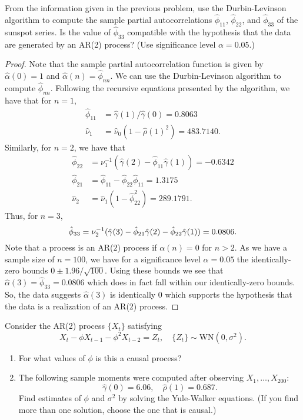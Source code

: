 \documentclass[12pt]{article}
\theoremstyle{definition}
\newenvironment{custompbm}[1]
  {\renewcommand\theproblem{#1}\problem}
  {\endproblem}
\begin{document}
\begin{custompbm}{5.2}
  From the information given in the previous problem, use the Durbin-Levinson
  algorithm to compute the sample partial autocorrelations $\hat{\phi}_{11}$, $\hat{\phi}_{22}$,
  and $\hat{\phi}_{33}$ of the sunspot series. Is the value of $\hat{\phi}_{33}$ compatible
  with the hypothesis that the data are generated by an AR(2) process? (Use significance level
  $\alpha = 0.05$.)
\end{custompbm}

\begin{proof}
  Note that the sample partial autocorrelation function is given by $\hat{\alpha}(0) = 1$ and
  $\hat{\alpha}(n) = \hat{\phi}_{nn}$. We can use the Durbin-Levinson algorithm
  to compute $\hat{\phi}_{nn}$. Following the recursive equations presented by the
  algorithm, we have that for $n = 1$,
  \begin{align*}
    \hat{\phi}_{11} &= \hat{\gamma}(1)/\hat{\gamma}(0) = 0.8063 \\
    \hat{\nu}_1 &= \hat{\nu}_0 (1 - \hat{\rho}(1)^2) = 483.7140.
  \end{align*}
  Similarly, for $n = 2$, we have that
  \begin{align*}
    \hat{\phi}_{22} &= \nu_1^{-1}(\hat{\gamma}(2) - \hat{\phi}_{11}\hat{\gamma}(1)) = -0.6342\\
    \hat{\phi}_{21} &= \hat{\phi}_{11} - \hat{\phi}_{22} \hat{\phi}_{11} = 1.3175\\
    \hat{\nu}_2 &= \hat{\nu}_1 (1 - \hat{\phi}_{22}^2) = 289.1791.
  \end{align*}
  Thus, for $n=3$,
  \[
    \hat{\phi}_{33} = \nu_2^{-1}(\hat{\gamma}(3) - \hat{\phi}_{21}\hat{\gamma}(2) - \hat{\phi}_{22}\hat{\gamma}(1)) = 0.0806\\.
  \]
  Note that a process is an AR($2$) process if $\alpha(n) = 0$ for $n > 2$. As we have a sample
  size of $n=100$, we have for a significance level $\alpha = 0.05$ the identically-zero
  bounds $0 \pm 1.96/\sqrt{100}$. Using these bounds we see that
  $\hat{\alpha}(3) = \hat{\phi}_{33} = 0.0806$ which does in fact fall within our
  identically-zero bounds. So, the data suggests $\hat{\alpha}(3)$ is identically 0 which
  supports the hypothesis that the data is a realization of an AR(2) process.
\end{proof}


\begin{custompbm}{5.3}
  Consider the AR(2) process $\{X_t\}$ satisfying
  \[
    X_t - \phi X_{t-1} - \phi^2 X_{t-2} = Z_t, \quad \{Z_t\} \sim \text{WN}(0, \sigma^2).
  \]
  \begin{enumerate}
    \item For what values of $\phi$ is this a causal process?
    \item The following sample moments were computed after observing $X_1,\dots, X_{200}$:
      \[
        \hat{\gamma}(0) = 6.06, \quad \hat{\rho}(1) = 0.687.
      \]
      Find estimates of $\phi$ and $\sigma^2$ by solving the Yule-Walker equations. (If
      you find more than one solution, choose the one that is causal.)
  \end{enumerate}
\end{custompbm}
\end{document}
